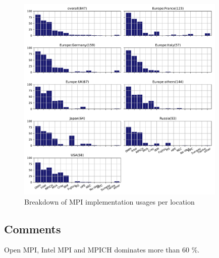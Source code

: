 \begin{figure}[htb]
\begin{center}
\includegraphics[width=10cm]{../pdfs/Q12.pdf}
\caption{Breakdown of MPI implementation usages per location}
\label{fig:Q12}
\end{center}
\end{figure}

\subsection{Comments}

Open MPI, Intel MPI and MPICH dominates more than 60 \%.
